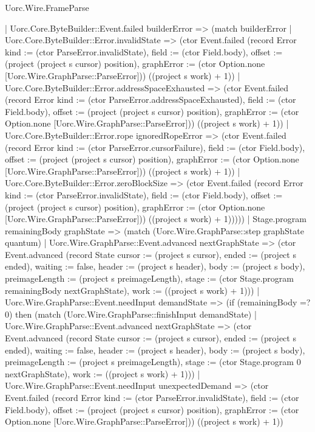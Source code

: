 \begin{lexlean}{Uorc.Wire.FrameParse}
\begin{semanticmodule}
{      | Uorc.Core.ByteBuilder::Event.failed builderError => (match builderError
        | Uorc.Core.ByteBuilder::Error.invalidState => (ctor Event.failed (record Error {kind := (ctor ParseError.invalidState), field := (ctor Field.body), offset := (project (project s cursor) position), graphError := (ctor Option.none [Uorc.Wire.GraphParse::ParseError])}) ((project s work) + 1))
        | Uorc.Core.ByteBuilder::Error.addressSpaceExhausted => (ctor Event.failed (record Error {kind := (ctor ParseError.addressSpaceExhausted), field := (ctor Field.body), offset := (project (project s cursor) position), graphError := (ctor Option.none [Uorc.Wire.GraphParse::ParseError])}) ((project s work) + 1))
        | Uorc.Core.ByteBuilder::Error.rope ignoredRopeError => (ctor Event.failed (record Error {kind := (ctor ParseError.cursorFailure), field := (ctor Field.body), offset := (project (project s cursor) position), graphError := (ctor Option.none [Uorc.Wire.GraphParse::ParseError])}) ((project s work) + 1))
        | Uorc.Core.ByteBuilder::Error.zeroBlockSize => (ctor Event.failed (record Error {kind := (ctor ParseError.invalidState), field := (ctor Field.body), offset := (project (project s cursor) position), graphError := (ctor Option.none [Uorc.Wire.GraphParse::ParseError])}) ((project s work) + 1)))))
    | Stage.program remainingBody graphState => (match (Uorc.Wire.GraphParse::step graphState quantum)
      | Uorc.Wire.GraphParse::Event.advanced nextGraphState => (ctor Event.advanced (record State {cursor := (project s cursor), ended := (project s ended), waiting := false, header := (project s header), body := (project s body), preimageLength := (project s preimageLength), stage := (ctor Stage.program remainingBody nextGraphState), work := ((project s work) + 1)}))
      | Uorc.Wire.GraphParse::Event.needInput demandState => (if (remainingBody =? 0) then (match (Uorc.Wire.GraphParse::finishInput demandState)
        | Uorc.Wire.GraphParse::Event.advanced nextGraphState => (ctor Event.advanced (record State {cursor := (project s cursor), ended := (project s ended), waiting := false, header := (project s header), body := (project s body), preimageLength := (project s preimageLength), stage := (ctor Stage.program 0 nextGraphState), work := ((project s work) + 1)}))
        | Uorc.Wire.GraphParse::Event.needInput unexpectedDemand => (ctor Event.failed (record Error {kind := (ctor ParseError.invalidState), field := (ctor Field.body), offset := (project (project s cursor) position), graphError := (ctor Option.none [Uorc.Wire.GraphParse::ParseError])}) ((project s work) + 1))
}
\end{semanticmodule}
\end{lexlean}
